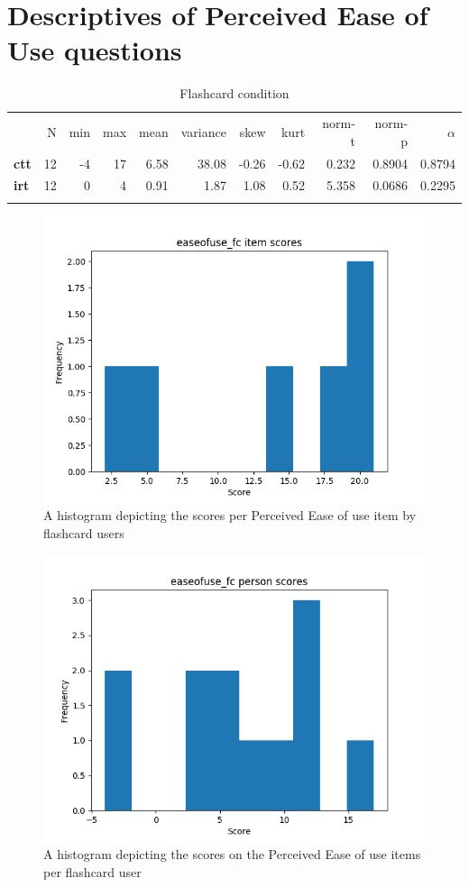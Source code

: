 \FloatBarrier
\section{Descriptives of Perceived Ease of Use questions}\label{ease-of-use}

\begin{longtable}[c]{@{}lrrrrrrrrrr@{}}
\caption{Flashcard condition}
\endfirsthead
\toprule\addlinespace
& N & min & max & mean & variance & skew & kurt & norm-t &
norm-p & $\alpha$
\\\addlinespace
\midrule
\textbf{ctt} & 12 & -4 & 17 & 6.58 & 38.08 & -0.26 & -0.62 & 0.232 &
0.8904 & 0.8794
\\\addlinespace
\textbf{irt} & 12 & 0 & 4 & 0.91 & 1.87 & 1.08 & 0.52 & 5.358 & 0.0686 &
0.2295
\\\addlinespace
\bottomrule
    \label{tab:easeofuse_fc}
\end{longtable}

\begin{figure}
    \centering
    \includegraphics[width=.7\textwidth]{img/easeofuse_fc_diff.png}
    \caption{A histogram depicting the scores per Perceived Ease of use item by flashcard users}
    \label{fig:easeofuse_fc_diff}
\end{figure}
\begin{figure}
    \centering
    \includegraphics[width=.7\textwidth]{img/easeofuse_fc_abil.png}
    \caption{A histogram depicting the scores on the Perceived Ease of use items per flashcard user}
    \label{fig:easeofuse_fc_abil}
\end{figure}

